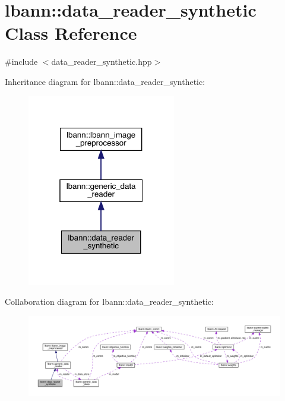 \hypertarget{classlbann_1_1data__reader__synthetic}{}\section{lbann\+:\+:data\+\_\+reader\+\_\+synthetic Class Reference}
\label{classlbann_1_1data__reader__synthetic}


{\ttfamily \#include $<$data\+\_\+reader\+\_\+synthetic.\+hpp$>$}



Inheritance diagram for lbann\+:\+:data\+\_\+reader\+\_\+synthetic\+:\nopagebreak
\begin{figure}[H]
\begin{center}
\leavevmode
\includegraphics[width=184pt]{classlbann_1_1data__reader__synthetic__inherit__graph}
\end{center}
\end{figure}


Collaboration diagram for lbann\+:\+:data\+\_\+reader\+\_\+synthetic\+:\nopagebreak
\begin{figure}[H]
\begin{center}
\leavevmode
\includegraphics[width=350pt]{classlbann_1_1data__reader__synthetic__coll__graph}
\end{center}
\end{figure}
